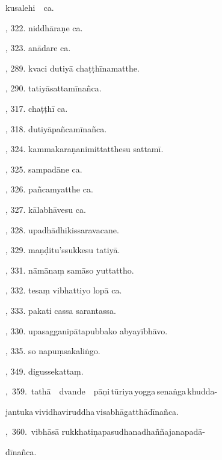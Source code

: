 \hspace{15mm} kusalehi\ \ ca.\hfill \pageref{sut:303}\par {}, 322. niddhāraṇe ca.\hfill \pageref{sut:304}\par {}, 323. anādare ca.\hfill \pageref{sut:305}\par {}, 289. kvaci dutiyā chaṭṭhīnamatthe.\hfill \pageref{sut:306}\par {}, 290. tatiyāsattamīnañca.\hfill \pageref{sut:307}\par {}, 317. chaṭṭhī ca.\hfill \pageref{sut:308}\par {}, 318. dutiyāpañcamīnañca.\hfill \pageref{sut:309}\par {}, 324. kammakaraṇanimittatthesu sattamī.\hfill \pageref{sut:310}\par {}, 325. sampadāne ca.\hfill \pageref{sut:311}\par {}, 326. pañcamyatthe ca.\hfill \pageref{sut:312}\par {}, 327. kālabhāvesu ca.\hfill \pageref{sut:313}\par {}, 328. upadhādhikissaravacane.\hfill \pageref{sut:314}\par {}, 329. maṇḍitu’ssukkesu tatiyā.\hfill \pageref{sut:315}\par {}, 331. nāmānaṃ samāso yuttattho.\hfill \pageref{sut:316}\par {}, 332. tesaṃ vibhattiyo lopā ca.\hfill \pageref{sut:317}\par {}, 333. pakati cassa sarantassa.\hfill \pageref{sut:318}\par {}, 330. upasagganipātapubbako abyayībhāvo.\hfill \pageref{sut:319}\par {}, 335. so napuṃsakaliṅgo.\hfill \pageref{sut:320}\par {}, 349. digussekattaṃ.\hfill \pageref{sut:321}\par {},~359.~tathā\ \ dvande\ \ pāṇi\,tūriya\,yogga\,senaṅga\,khudda-\par \noindent
\hspace{15mm} jantuka\,vividhaviruddha\,visabhāgatthādīnañca.\hfill \pageref{sut:322}\par {},~360.~vibhāsā rukkhatiṇapasudhanadhaññajanapadā-\par \noindent
\hspace{15mm} dīnañca.\hfill \pageref{sut:323}\par \noindent
